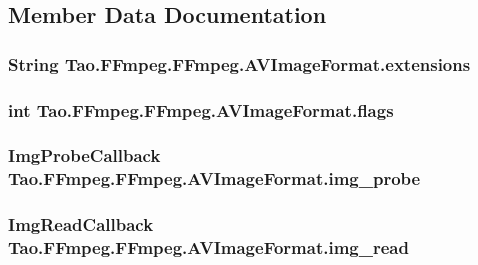 \subsection{Member Data Documentation}
\hypertarget{struct_tao_1_1_f_fmpeg_1_1_f_fmpeg_1_1_a_v_image_format_a2276abd99449cfe819999d1349e83f66}{
\subsubsection[{extensions}]{\setlength{\rightskip}{0pt plus 5cm}String {\bf Tao.FFmpeg.FFmpeg.AVImageFormat.extensions}}}
\label{struct_tao_1_1_f_fmpeg_1_1_f_fmpeg_1_1_a_v_image_format_a2276abd99449cfe819999d1349e83f66}
\hypertarget{struct_tao_1_1_f_fmpeg_1_1_f_fmpeg_1_1_a_v_image_format_ab4a2cd277689221a9a7649b7ce136b22}{
\subsubsection[{flags}]{\setlength{\rightskip}{0pt plus 5cm}int {\bf Tao.FFmpeg.FFmpeg.AVImageFormat.flags}}}
\label{struct_tao_1_1_f_fmpeg_1_1_f_fmpeg_1_1_a_v_image_format_ab4a2cd277689221a9a7649b7ce136b22}
\hypertarget{struct_tao_1_1_f_fmpeg_1_1_f_fmpeg_1_1_a_v_image_format_a582e4fcd1de7ff360d659f34ea039793}{
\subsubsection[{img\_\-probe}]{\setlength{\rightskip}{0pt plus 5cm}ImgProbeCallback {\bf Tao.FFmpeg.FFmpeg.AVImageFormat.img\_\-probe}}}
\label{struct_tao_1_1_f_fmpeg_1_1_f_fmpeg_1_1_a_v_image_format_a582e4fcd1de7ff360d659f34ea039793}
\hypertarget{struct_tao_1_1_f_fmpeg_1_1_f_fmpeg_1_1_a_v_image_format_a894e93c491833f8bb2f96c8233c79f70}{
\subsubsection[{img\_\-read}]{\setlength{\rightskip}{0pt plus 5cm}ImgReadCallback {\bf Tao.FFmpeg.FFmpeg.AVImageFormat.img\_\-read}}}
